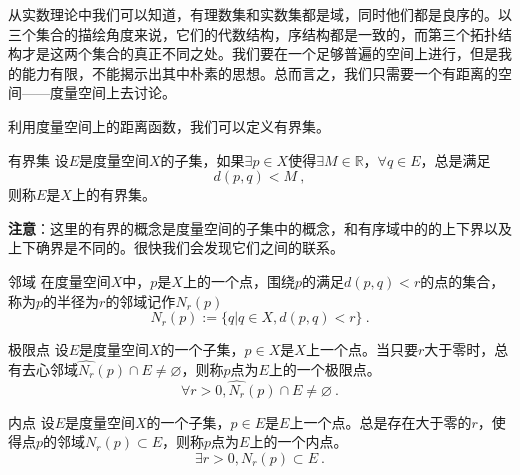 
\begin{issues}
\issueDraft
\issueTODO
\issueAbstract
{}
\end{issues}



从实数理论中我们可以知道，有理数集和实数集都是域，同时他们都是良序的。以三个集合的描绘角度来说，它们的代数结构，序结构都是一致的，而第三个拓扑结构才是这两个集合的真正不同之处。我们要在一个足够普遍的空间上进行，但是我的能力有限，不能揭示出其中朴素的思想。总而言之，我们只需要一个有距离的空间——度量空间上去讨论。

利用度量空间上的距离函数，我们可以定义有界集。

\begin{definition}{有界集}
设$E$是度量空间$X$的子集，如果$\exists{p}\in{X}$使得$\exists{M}\in{\mathbb{R}}$，$\forall{q}\in{E}$，总是满足
\[d(p,q)<M~,\]
则称$E$是$X$上的有界集。
\end{definition}

\textbf{注意}：这里的有界的概念是度量空间的子集中的概念，和有序域中的的上下界以及上下确界是不同的。很快我们会发现它们之间的联系。

\begin{definition}{邻域}
在度量空间$X$中，$p$是$X$上的一个点，围绕$p$的满足$d(p,q)<r$的点的集合，称为$p$的半径为$r$的邻域记作$N_r(p)$
\begin{equation}
N_r(p):=\{q|q\in{X},d(p,q)<r\}~.
\end{equation}
\end{definition}


\begin{definition}{极限点}
设$E$是度量空间$X$的一个子集，$p\in{X}$是$X$上一个点。当只要$r$大于零时，总有{\heiti 去心邻域}$\hat{N_r}(p)\cap{E}\not=\varnothing$，则称$p$点为$E$上的一个{\heiti 极限点}。
\begin{equation}
\forall{r>0},\hat{N_r}(p)\cap{E}\not=\varnothing~.
\end{equation}
\end{definition}



\begin{definition}{内点}
设$E$是度量空间$X$的一个子集，$p\in{E}$是$E$上一个点。总是存在大于零的$r$，使得点$p$的邻域$N_r(p)\subset{E}$，则称$p$点为$E$上的一个{\heiti 内点}。
\begin{equation}
\exists{r>0},N_r(p)\subset{E}~.
\end{equation}
\end{definition}

